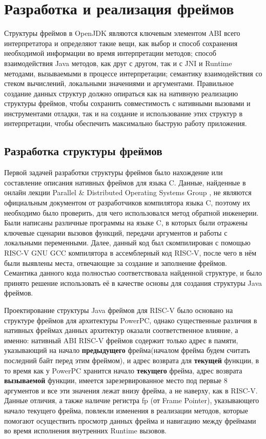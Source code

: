\section{Разработка и реализация фреймов}

Структуры фреймов в OpenJDK являются ключевым элементом ABI всего интерпретатора и определяют такие вещи, как выбор и способ сохранения необходимой информации во время интерпретации методов; способ взаимодействия Java методов, как друг с другом, так и с JNI и Runtime методами, вызываемыми в процессе интерпретации; семантику взаимодействия со стеком вычислений, локальными значениями и аргументами. Правильное создание данных структур должно опираться как на нативную реализацию структуры фреймов, чтобы сохранить совместимость с нативными вызовами и инструментами отладки, так и на создание и использование этих структур в интерпретации, чтобы обеспечить максимально быструю работу приложения.


\subsection{Разработка структуры фреймов}

Первой задачей разработки структуры фреймов было нахождение или составление описания нативных фреймов для языка C. Данные, найденные в онлайн лекции Parallel \& Distributed Operating Systems Group \cite{lecture:frames}, не являются официальным документом от разработчиков компилятора языка C, поэтому их необходимо было проверить, для чего использовался метод обратной инженерии. Были написаны различные программы на языке C, в которых были отражены ключевые сценарии вызовов функций, передачи аргументов и работы с локальными переменными. Далее, данный код был скомпилирован с помощью RISC-V GNU GCC \cite{riscv:gnu} компилятора в ассемблерный код RISC-V, после чего в нём были выявлены места, отвечающие за создание и заполнение фреймов. Семантика данного кода полностью соответствовала найденной структуре, и было принято решение использовать её в качестве основы для создания структуры Java фреймов. 

Проектирование структуры Java фреймов для RISC-V было основано на структуре фреймов для архитектуры PowerPC, однако существенные различия в нативных фреймах данных архитектур оказали соответственное влияние, а именно: нативный ABI RISC-V фреймов содержит только адрес в памяти, указывающий на начало \textbf{предыдущего} фрейма(началом фрейма будем считать последний байт перед этим фреймом), и адрес возврата для \textbf{текущей} функции, в то время как у PowerPC хранится начало \textbf{текущего} фрейма, адрес возврата \textbf{вызываемой} функции, имеется зарезервированное место под первые 8 аргументов и все эти значения лежат внизу фрейма, а не наверху, как в RISC-V.
Данные отличия, а также наличие регистра fp (от Frame Pointer), указывающего начало текущего фрейма, повлекли изменения в реализации методов, которые помогают осуществить просмотр данных фрейма и навигацию между фреймами во время исполнения внутренних Runtime вызовов.

